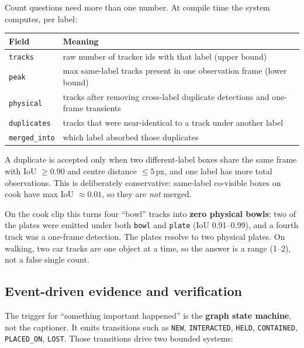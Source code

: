 \documentclass[10pt,a4paper]{article}
\newcommand{\code}[1]{\texttt{\small #1}}
\begin{document}
Count questions need more than one number. At compile time the system computes, per label:

\begin{center}
\small
\begin{tabularx}{\linewidth}{@{}l L@{}}
\toprule
\textbf{Field} & \textbf{Meaning} \\
\midrule
\code{tracks} & raw number of tracker ids with that label (upper bound) \\
\code{peak} & max same-label tracks present in one observation frame (lower bound) \\
\code{physical} & tracks after removing cross-label duplicate detections and one-frame transients \\
\code{duplicates} & tracks that were near-identical to a track under another label \\
\code{merged\_into} & which label absorbed those duplicates \\
\bottomrule
\end{tabularx}
\end{center}

\noindent
A duplicate is accepted only when two different-label boxes share the same frame with IoU
\(\geq 0.90\) and centre distance \(\leq 5\)\,px, and one label has more total observations. This is
deliberately conservative: same-label co-visible boxes on cook have max IoU \(\approx 0.01\), so they
are \emph{not} merged.

\noindent
On the cook clip this turns four ``bowl'' tracks into \textbf{zero physical bowls}: two of the plates
were emitted under both \code{bowl} and \code{plate} (IoU 0.91--0.99), and a fourth track was a
one-frame detection. The plates resolve to two physical plates. On walking, two car tracks are one
object at a time, so the answer is a range (1--2), not a false single count.

\subsection{Event-driven evidence and verification}

The trigger for ``something important happened'' is the \textbf{graph state machine}, not the
captioner. It emits transitions such as \code{NEW}, \code{INTERACTED}, \code{HELD}, \code{CONTAINED},
\code{PLACED\_ON}, \code{LOST}. Those transitions drive two bounded systems:
\end{document}

